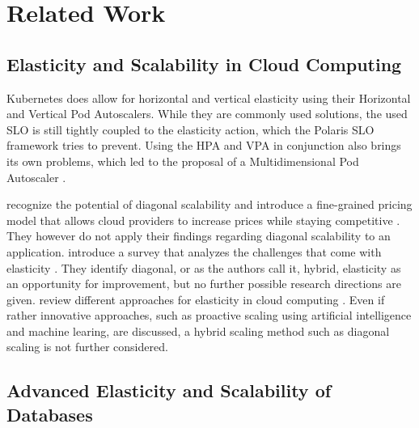 \chapter{Related Work}
\label{ch:related-work}

\section{Elasticity and Scalability in Cloud Computing}


Kubernetes does allow for horizontal and vertical elasticity using their Horizontal and Vertical Pod Autoscalers\cite{thekubernetesauthorsHorizontalPodAutoscaling,thekubernetesauthorsVerticalPodAutoscaler}. While they are commonly used solutions, the used SLO is still tightly coupled to the elasticity action, which the Polaris SLO framework tries to prevent. Using the HPA and VPA in conjunction also brings its own problems, which led to the proposal of a Multidimensional Pod Autoscaler \cite{thekubernetesauthorsMultidimensionalPodAutoscaler}.

\citeauthor{laubisCloudAdoptionFineGrained2016} recognize the potential of diagonal scalability and introduce a fine-grained pricing model that allows cloud providers to increase prices while staying competitive \cite{laubisCloudAdoptionFineGrained2016}. They however do not apply their findings regarding diagonal scalability to an application. \citeauthor{quAutoscalingWebApplications2017} introduce a survey that analyzes the challenges that come with elasticity \cite{quAutoscalingWebApplications2017}. They identify diagonal, or as the authors call it, hybrid, elasticity as an opportunity for improvement, but no further possible research directions are given. \citeauthor{al-dhuraibiElasticityCloudComputing2018} review different approaches for elasticity in cloud computing \cite{al-dhuraibiElasticityCloudComputing2018}. Even if rather innovative approaches, such as proactive scaling using artificial intelligence and machine learing, are discussed, a hybrid scaling method such as diagonal scaling is not further considered.

\section{Advanced Elasticity and Scalability of Databases}

